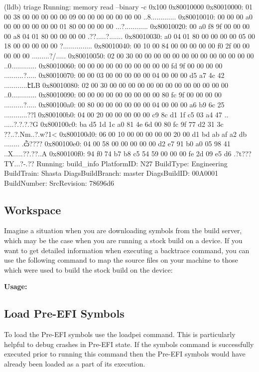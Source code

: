 \begin{TerminalOutput}
(lldb) triage
Running: memory read --binary -c 0x100 0x80010000
0x80010000: 01 00 38 00 00 00 00 00 09 00 00 00 00 00 00 00  ..8.............
0x80010010: 00 00 00 a0 00 00 00 00 00 00 01 80 00 00 00 00  ...?............
0x80010020: 00 a0 f8 9f 00 00 00 00 a8 04 01 80 00 00 00 00  .??.....?.......
0x80010030: a0 04 01 80 00 00 00 00 05 00 18 00 00 00 00 00  ?...............
0x80010040: 00 10 00 84 00 00 00 00 00 f0 2f 00 00 00 00 00  .........?/.....
0x80010050: 02 00 30 00 00 00 00 00 00 00 00 00 00 00 00 00  ..0.............
0x80010060: 00 00 00 00 00 00 00 00 00 00 fd 9f 00 00 00 00  ..........?.....
0x80010070: 00 00 03 00 00 00 00 00 04 00 00 00 d5 a7 4c 42  ............էLB
0x80010080: 02 00 30 00 00 00 00 00 00 00 00 00 00 00 00 00  ..0.............
0x80010090: 00 00 00 00 00 00 00 00 00 80 fc 9f 00 00 00 00  ..........?.....
0x800100a0: 00 80 00 00 00 00 00 00 04 00 00 00 a6 b9 6c 25  ............??l%
0x800100b0: 04 00 20 00 00 00 00 00 c9 8c d1 1f c5 03 a4 47  .. .....?.?.?.?G
0x800100c0: ba d5 1d 1c a0 81 4e 6d 00 80 fc 9f 77 d2 31 3c  ??..?.Nm..?.w?1<
0x800100d0: 06 00 10 00 00 00 00 00 20 00 d1 bd ab af a2 db  ........ .ѽ????
0x800100e0: 04 00 58 00 00 00 00 00 d2 e7 91 b0 a0 05 98 41  ..X.....??.??..A
0x800100f0: 94 f0 74 b7 b8 c5 54 59 00 00 00 fe 2d 09 e5 d6  .?t???TY...?-.??
Running: build_info
PlatformID: N27
BuildType: Engineering
BuildTrain: Shasta
DiagsBuildBranch: master
DiagsBuildID: 00A0001
BuildNumber: 
SrcRevision: 78696d6
\end{TerminalOutput}

\subsection{Workspace} 
Imagine a situation when you are downloading symbols from the build server, which may be the case when you
are running a stock build on a device. If you want to get detailed information when
executing a backtrace command, you can use the following command to map the source
files on your machine to those which were used to build the stock build on the device:

\textcolor{SmokeyDarkBlue}{\bfseries Usage:} 

\subsection{Load Pre-EFI Symbols}
\label{sec:LoadPei}

To load the Pre-EFI symbols use the loadpei command. This is particularly 
helpful to debug crashes in Pre-EFI state. If the symbols command is successfully
executed prior to running this command then the Pre-EFI symbols would have already
been loaded as a part of its execution.

